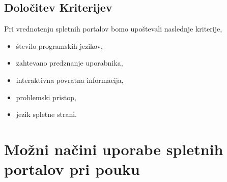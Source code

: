 \subsection{Določitev Kriterijev}
\label{sec:dolocitev_kriterijev}

Pri vrednotenju spletnih portalov bomo upoštevali naslednje
kriterije,


\begin{itemize}
\item število programskih jezikov,
\item zahtevano predznanje uporabnika,
\item interaktivna povratna informacija,
\item problemski pristop,
\item jezik spletne strani.
\end{itemize}

\section{Možni načini uporabe spletnih portalov pri pouku}
\label{sec:načini_uporabe_sp}

